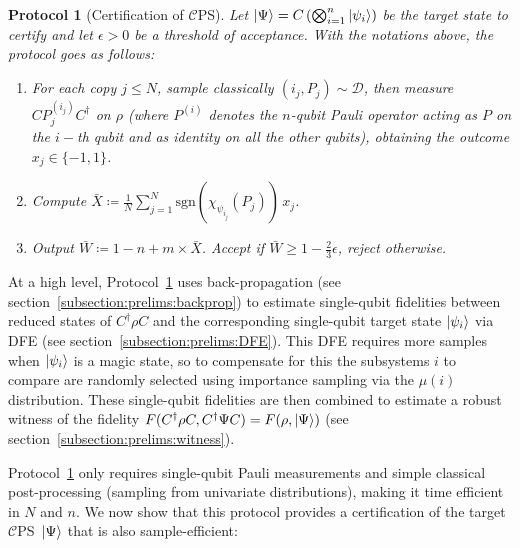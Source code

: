 \documentclass[a4paper,twocolumn,11pt,unpublished]{quantumarticle}
\newtheorem{protocol}{Protocol}
\newcommand{\np}{m}
\newcommand{\CEPS}{$\mathcal C$PS}
\newcommand{\pdist}{\mathcal D} %
\newcommand{\copyindex}{j}
\newcommand{\qubit}{i}
\begin{document}
        \begin{protocol}[Certification of \CEPS]
            \label{protocol:certification}
            Let $\ket\Psi = C\left(\bigotimes_{\qubit=1}^n\ket{\psi_\qubit}\right)$ be the target state to certify and let $\epsilon>0$ be a threshold of acceptance. With the notations above, the protocol goes as follows:
            \begin{enumerate}
                \item For each copy $\copyindex\leq N$, sample classically $(\qubit_j, P_j)\sim \pdist$, then measure $C P_j^{(i_j)} C^\dagger$ on $\rho$ (where $P^{(i)}$ denotes the $n$-qubit Pauli operator acting as $P$ on the $i-$th qubit and as identity on all the other qubits), obtaining the outcome $x_j\in\{-1, 1\}$.
                \item Compute $\bar X \coloneqq \frac{1}{N}\sum_{\copyindex=1}^N \mathrm{sgn}(\chi_{\psi_{\qubit_j}}(P_j)) \,x_j
                $.
                \item Output $\bar W\coloneqq 1-n+\np\times \bar X$. Accept if $\bar W\ge1-\frac23\epsilon$, reject otherwise.
            \end{enumerate}
        \end{protocol}

        At a high level, Protocol~\ref{protocol:certification} uses back-propagation (see section~\ref{subsection:prelims:backprop}) to estimate single-qubit fidelities between reduced states of $C^\dag\rho C$ and the corresponding single-qubit target state $\ket{\psi_i}$ via DFE (see section~\ref{subsection:prelims:DFE}). This DFE requires more samples when $\ket{\psi_i}$ is a magic state, so to compensate for this the subsystems $i$ to compare are randomly selected using importance sampling via the $\mu(i)$ distribution. These single-qubit fidelities are then combined to estimate a robust witness of the fidelity $F(C^\dag\rho C,C^\dag\Psi C)=F(\rho,\ket\Psi)$ (see section~\ref{subsection:prelims:witness}).
        
        Protocol~\ref{protocol:certification} only requires single-qubit Pauli measurements and simple classical post-processing (sampling from univariate distributions), making it time efficient in $N$ and $n$. We now show that this protocol provides a certification of the target \CEPS\ $\ket\Psi$ that is also sample-efficient:
\end{document}
